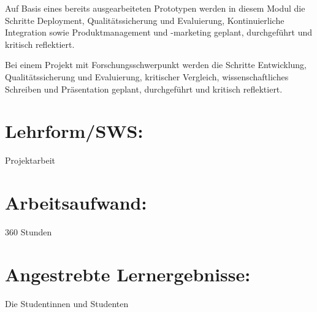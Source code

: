 Auf Basis eines bereits ausgearbeiteten Prototypen werden in diesem
Modul die Schritte Deployment, Qualitätssicherung und Evaluierung,
Kontinuierliche Integration sowie Produktmanagement und -marketing
geplant, durchgeführt und kritisch reflektiert.

Bei einem Projekt mit Forschungsschwerpunkt werden die Schritte
Entwicklung, Qualitätssicherung und Evaluierung, kritischer Vergleich,
wissenschaftliches Schreiben und Präsentation geplant, durchgeführt und
kritisch reflektiert.

\section*{Lehrform/SWS:\label{/mi-2017/modulbeschreibungen-master/MA_Modul_Projekt_Verwertung}}\label{lehrformswspathlabelmi-2017modulbeschreibungen-mastermaux5fmodulux5fprojektux5fverwertung}

Projektarbeit

\section*{Arbeitsaufwand:\label{/mi-2017/modulbeschreibungen-master/MA_Modul_Projekt_Verwertung}}\label{arbeitsaufwandpathlabelmi-2017modulbeschreibungen-mastermaux5fmodulux5fprojektux5fverwertung}

360 Stunden

\section*{Angestrebte
Lernergebnisse:\label{/mi-2017/modulbeschreibungen-master/MA_Modul_Projekt_Verwertung}}\label{angestrebte-lernergebnissepathlabelmi-2017modulbeschreibungen-mastermaux5fmodulux5fprojektux5fverwertung}

Die Studentinnen und Studenten

